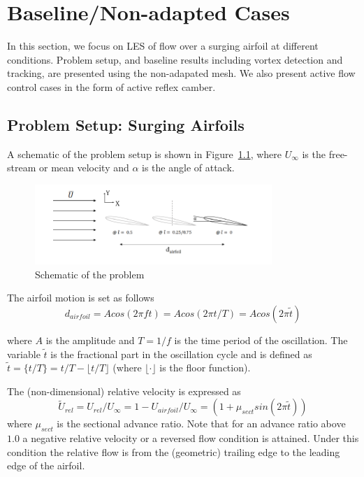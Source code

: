 \chapter{Baseline/Non-adapted Cases}
\label{chapter:baseline_results}


In this section, we focus on LES of flow over a surging airfoil at different conditions. Problem setup, and baseline results including vortex detection and tracking, are presented using the non-adapated mesh. We also present active flow control cases in the form of active reflex camber. 

\label{sec:baseline_results}

\section{Problem Setup: Surging Airfoils}
\label{sec:problem_setup_baseline}

A schematic of the problem setup is shown in Figure~\ref{fig:SetUpSketch}, where $U_\infty$ is the free-stream or mean velocity and $\alpha$ is the angle of attack.

\begin{figure}[H]
\centering
\includegraphics[width=0.8\textwidth]{figures/Setup/Setup.png}
\caption{Schematic of the problem}
\label{fig:SetUpSketch}
\end{figure}

The airfoil motion is set as follows
\begin{equation}
\label{eq:displacement}
  d_{airfoil} = A cos(2\pi f t) =  Acos(2\pi t/T) = Acos(2\pi\tilde{t})
\end{equation}

\noindent where $A$ is the amplitude and $T=1/f$ is the time period of the oscillation.
The variable $\tilde{t}$ is the fractional part in the oscillation cycle and is defined as $\tilde{t}=\{t/T\} = t/T - \lfloor t/T \rfloor$ (where $\lfloor \cdot \rfloor$ is the floor function).

The (non-dimensional) relative velocity is expressed as
\begin{equation}
\label{eq:relVelocity}
  \tilde{U}_{rel} = U_{rel}/U_\infty = 1 - U_{airfoil}/U_\infty = (1+\mu_{sect} sin(2\pi\tilde{t}))
\end{equation}
\noindent where $\mu_{sect}$ is the sectional advance ratio.
Note that for an advance ratio above $1.0$ a negative relative velocity or a reversed flow condition is attained.
Under this condition the relative flow is from the (geometric) trailing edge to the leading edge of the airfoil.

